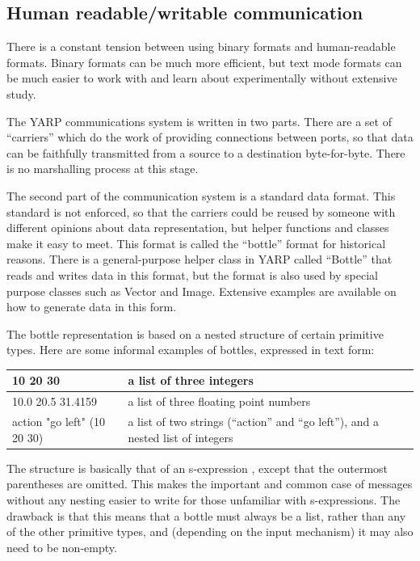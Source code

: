 \subsection{Human readable/writable communication}

There is a constant tension between using binary formats and
human-readable formats.  Binary formats can be much more efficient,
but text mode formats can be much easier to work with and learn about
experimentally without extensive study.

The YARP communications system is written in two parts.  There
are a set of ``carriers'' which do the work of providing
connections between ports, so that data can be faithfully 
transmitted from a source to a destination byte-for-byte.
There is no marshalling process at this stage.

The second part of the communication system is a standard data format.
This standard is not enforced, so that the carriers could be reused by
someone with different opinions about data representation, but helper
functions and classes make it easy to meet.  This format is called the
``bottle'' format for historical reasons.  There is a general-purpose
helper class in YARP called ``Bottle'' that reads and writes data in
this format, but the format is also used by special purpose classes
such as Vector and Image.  Extensive examples are available on how
to generate data in this form.

The bottle representation is based on a nested structure of certain
primitive types.  
Here are some informal examples of bottles, expressed in text form:

\begin{tabular}{|p{5cm}|p{6cm}|}
\hline
10 20 30 & a list of three integers \\
\hline
10.0 20.5 31.4159 & a list of three floating point numbers \\
\hline
action "go left" (10 20 30) & a list of two strings (``action'' and ``go left''), and a nested list of integers \\
\hline
\end{tabular}

The structure is basically that of an s-expression
\cite{rivest1997sexp}, except that the outermost parentheses are
omitted.  This makes the important and common case of messages without
any nesting easier to write for those unfamiliar with s-expressions.
The drawback is that this means that a bottle must always be a list,
rather than any of the other primitive types, and (depending on the
input mechanism) it may also need to be non-empty.

